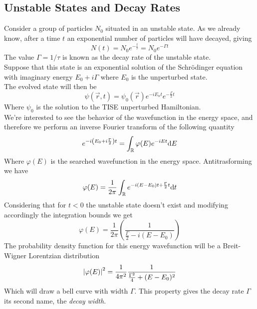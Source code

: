 \documentclass[../qm.tex]{subfiles}
\begin{document}
\subsection{Unstable States and Decay Rates}
Consider a group of particles $N_0$ situated in an unstable state. As we already know, after a time $t$ an exponential number of particles will have decayed, giving
\begin{equation*}
	N(t)=N_0e^{-\frac{t}{\tau}}=N_0e^{-\Gamma t}
\end{equation*}
The value $\Gamma=1/\tau$ is known as the decay rate of the unstable state.\\
Suppose that this state is an exponential solution of the Schrödinger equation with imaginary energy $E_0+i\Gamma$ where $E_0$ is the unperturbed state.\\
The evolved state will then be
\begin{equation*}
	\psi(\vec{r},t)=\psi_0(\vec{r})e^{-iE_nt}e^{-\frac{\Gamma}{2}t}
\end{equation*}
Where $\psi_0$ is the solution to the TISE unperturbed Hamiltonian.\\
We're interested to see the behavior of the wavefunction in the energy space, and therefore we perform an inverse Fourier transform of the following quantity
\begin{equation*}
	e^{-i\left( E_0+i\frac{\Gamma}{2} \right)t}=\int_{\mathbb{R}}^{}\varphi(E)e^{-iEt}\dd E
\end{equation*}
Where $\varphi(E)$ is the searched wavefunction in the energy space. Antitrasforming we have
\begin{equation}
	\varphi(E)=\frac{1}{2\pi}\int_{\mathbb{R}}^{}e^{-i(E-E_0)t+\frac{\Gamma}{2}t}\dd t
	\label{eq:energydistweak}
\end{equation}
Considering that for $t<0$ the unstable state doesn't exist and modifying accordingly the integration bounds we get
\begin{equation*}
	\varphi(E)=\frac{1}{2\pi}\left( \frac{1}{\frac{\Gamma}{2}-i(E-E_0)} \right)
\end{equation*}
The probability density function for this energy wavefunction will be a Breit-Wigner Lorentzian distribution
\begin{equation*}
	\abs{\varphi(E)}^2=\frac{1}{4\pi^2}\frac{1}{\frac{\Gamma^2}{4}+(E-E_0)^2}
\end{equation*}
Which will draw a bell curve with width $\Gamma$. This property gives the decay rate $\Gamma$ its second name, the \emph{decay width}.\\
\end{document}
